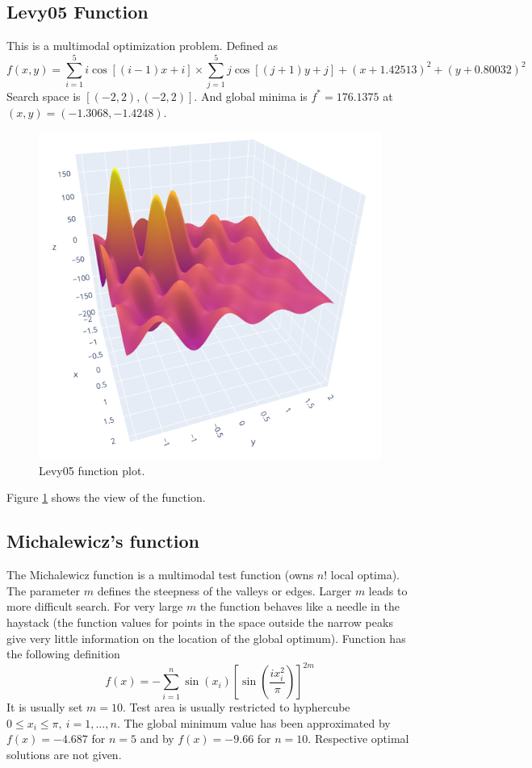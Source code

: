 \subsection{Levy05 Function}
This is a multimodal optimization problem. Defined as
$$ f(x,y) = \sum_{i=1}^{5} i \cos[(i-1)x + i] \times \sum_{j=1}^{5} j \cos[(j+1)y+j] + (x+1.42513)^2 + (y+0.80032)^2 $$
Search space is $[(-2, 2), (-2, 2)]$. And global minima is $f^*=176.1375$ at $(x, y)=(-1.3068, -1.4248)$. 
\begin{figure}
	\centering
	\includegraphics[scale=0.5]{figures/levy05-function-plot.png}
	\caption{Levy05 function plot.}
	\label{fig:levy05-function-plot}
\end{figure}
Figure \ref{fig:levy05-function-plot} shows the view of the function.

\subsection{Michalewicz's function}
The Michalewicz function is a multimodal test function (owns $n!$ local optima).
The parameter $m$ defines the steepness of the valleys or edges. 
Larger $m$ leads to more difficult search. 
For very large $m$ the function behaves like a needle in the haystack (the function values for points in the space outside the narrow peaks give very little information on the location of the global optimum). 
Function has the following definition
$$ f(x) = -\sum_{i=1}^{n}\sin(x_i) \left[ \sin(\frac{ix_i^2}{\pi}) \right]^{2m}  $$
It is usually set $m=10$. Test area is usually restricted to hyphercube $0 \leq x_i \leq \pi,\ i = 1, \dots, n$. The global minimum value has been approximated by $f(x)=-4.687$ for $n=5$ and by $f(x)=-9.66$ for $n=10$.
Respective optimal solutions are not given.

